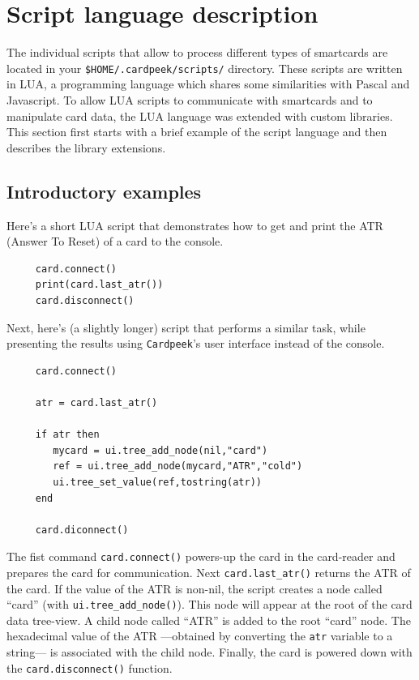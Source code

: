 \documentclass[11pt]{report}
\newcommand{\syn}[1]{\texttt{#1}}
\begin{document}
\chapter{Script language description}

The individual scripts that allow to process different types of smartcards are located in your 
\texttt{\$HOME/.cardpeek/scripts/} directory.
These scripts are written in LUA, a programming language which shares some similarities with Pascal and Javascript.
To allow LUA scripts to communicate with smartcards and to manipulate card data, the LUA language was extended with custom libraries.
This section first starts with a brief example of the script language and then describes the library extensions.

\section{Introductory examples}

Here's a short LUA script that demonstrates how to get and print the ATR (Answer To Reset) of a card to the console.

\begin{verbatim}
     card.connect()
     print(card.last_atr())
     card.disconnect()
\end{verbatim}

Next, here's (a slightly longer) script that performs a similar task, while presenting the results using \texttt{Cardpeek}'s user interface instead of the console. 

\begin{verbatim}
     card.connect()

     atr = card.last_atr()

     if atr then
        mycard = ui.tree_add_node(nil,"card")
        ref = ui.tree_add_node(mycard,"ATR","cold")
        ui.tree_set_value(ref,tostring(atr))
     end

     card.diconnect()
\end{verbatim}

The fist command \syn{card.connect()} powers-up the card in the card-reader and prepares the card for communication. 
Next \syn{card.last\_atr()} returns the ATR of the card. 
If the value of the ATR is non-nil, the script creates a node called ``card'' (with \syn{ui.tree\_add\_node()}). 
This node will appear at the root of the card data tree-view.
A child node called ``ATR'' is added to the root ``card'' node. 
The hexadecimal value of the ATR ---obtained by converting the \texttt{atr} variable to a string---  is associated with the child node.
Finally, the card is powered down with the \syn{card.disconnect()} function.
\end{document}
